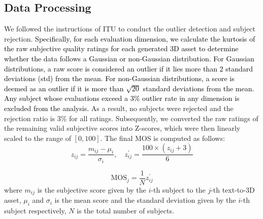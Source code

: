 \subsection{Data Processing}

We followed the instructions of ITU \cite{other:itu} to conduct the outlier detection and subject rejection. \textcolor{black}{Specifically, for each evaluation dimension, we calculate the kurtosis of the raw subjective quality ratings for each generated 3D asset to determine whether the data follows a Gaussian or non-Gaussian distribution. For Gaussian distributions, a raw score is considered an outlier if it lies more than 2 standard deviations (std) from the mean. For non-Gaussian distributions, a score is deemed as an outlier if it is more than $\sqrt{20}$ standard deviations from the mean. Any subject whose evaluations exceed a 3\% outlier rate in any dimension is excluded from the analysis.} As a result, no subjects were rejected and the rejection ratio is 3\% for all ratings. Subsequently, we converted the raw ratings of the remaining valid subjective scores into Z-scores, which were then linearly scaled to the range of $\left [ 0,100 \right ]$. The final MOS is computed as follows:
\begin{equation}
z_{ij} = \frac{m_{ij}-\mu_{i}}{\sigma_{i}}, \quad z_{ij}^{'} = \frac{100\times(z_{ij} + 3)}{6}
\end{equation}

\begin{equation}
\text{MOS}_{j} = \frac{1}{N} z_{ij}^{'}
\end{equation}
where $m_{ij}$ is the subjective score given by the $i$-th subject to the $j$-th text-to-3D asset, $\mu_{i}$ and $\sigma_{i}$ is the mean score and the standard deviation given by the $i$-th subject respectively, $N$ is the total number of subjects. 
\vspace{-15pt}
